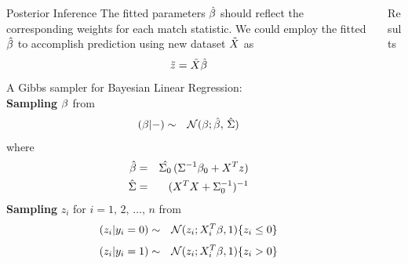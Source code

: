 \documentclass[final]{beamer}
\newlength{\onecolwid}
\newlength{\twocolwid}
\begin{document}
\begin{frame}[t]
\begin{columns}[t]
\begin{column}{\twocolwid}
\begin{columns}[t,totalwidth=\twocolwid]
\begin{column}{\onecolwid}
\begin{block}{Posterior Inference}
The fitted parameters $\hat{\boldmath{\beta}}$ should reflect the corresponding weights for each match statistic. We could employ the fitted $\hat{\boldmath{\beta}}$ to accomplish prediction using new dataset $\tilde{\boldmath{X}}$ as
\begin{equation}
\tilde{\boldmath{z}} = \tilde{\boldmath{X}} \hat{\boldmath{\beta}}
\label{eq:pred}
\end{equation}
\newline
A Gibbs sampler for Bayesian Linear Regression:
\newline \\
\textbf{Sampling} $\boldmath{\beta}$ from
\begin{eqnarray}
(\boldmath{\beta} | -) &\sim& \mathcal{N} ( \boldmath{\beta}; \boldmath{\hat{\beta} }, \, \hat{\Sigma} )
\end{eqnarray}
where
\begin{eqnarray*}
\boldmath{\hat{\beta}} &=& \hat{\Sigma_0} \, ( \Sigma^{-1} \boldmath{\beta_0} + \boldmath{X}^T \boldmath{z} ) \\
\hat{\Sigma} &=& ( \boldmath{X}^T \boldmath{X} + \Sigma_0^{-1} )^{-1}
\end{eqnarray*}
\textbf{Sampling} $z_i$ for $i = 1, \, 2, \, \ldots, \, n$ from
\begin{eqnarray}
(z_i | y_i=0) &\sim& \mathcal{N} ( z_i; X_i^T \boldmath{\beta}, 1 ) \{z_i\leq0\}
\end{eqnarray}
\begin{eqnarray}
(z_i | y_i=1) &\sim& \mathcal{N} ( z_i; X_i^T \boldmath{\beta}, 1 ) \{z_i>0\}
\end{eqnarray}
\end{block}


\end{column} %

\begin{column}{\onecolwid} %


\begin{block}{Results}


\end{block}
\end{column}
\end{columns}
\end{column}
\end{columns}
\end{frame}
\end{document}
